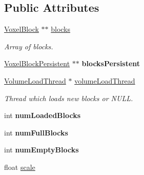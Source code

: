 \subsection*{\-Public \-Attributes}
\begin{DoxyCompactItemize}
\item 
\hypertarget{classVoxelVolume_ac5d3454b2ce3d2fea90c431b1aba0f3f}{
\hyperlink{classVoxelBlock}{\-Voxel\-Block} $\ast$$\ast$ \hyperlink{classVoxelVolume_ac5d3454b2ce3d2fea90c431b1aba0f3f}{blocks}}
\label{d0/d1c/classVoxelVolume_ac5d3454b2ce3d2fea90c431b1aba0f3f}

\begin{DoxyCompactList}\small\item\em \-Array of blocks. \end{DoxyCompactList}\item 
\hypertarget{classVoxelVolume_adee15c96fe563a59e2715898b209c68e}{
\hyperlink{classVoxelBlockPersistent}{\-Voxel\-Block\-Persistent} $\ast$$\ast$ {\bfseries blocks\-Persistent}}
\label{d0/d1c/classVoxelVolume_adee15c96fe563a59e2715898b209c68e}

\item 
\hypertarget{classVoxelVolume_a97000d1f3dc5808a9666240184e7fd3d}{
\hyperlink{classVolumeLoadThread}{\-Volume\-Load\-Thread} $\ast$ \hyperlink{classVoxelVolume_a97000d1f3dc5808a9666240184e7fd3d}{volume\-Load\-Thread}}
\label{d0/d1c/classVoxelVolume_a97000d1f3dc5808a9666240184e7fd3d}

\begin{DoxyCompactList}\small\item\em \-Thread which loads new blocks or \-N\-U\-L\-L. \end{DoxyCompactList}\item 
\hypertarget{classVoxelVolume_a88fe169a5d3eee4ded15a803eeb531e0}{
int {\bfseries num\-Loaded\-Blocks}}
\label{d0/d1c/classVoxelVolume_a88fe169a5d3eee4ded15a803eeb531e0}

\item 
\hypertarget{classVoxelVolume_a035d8438b53aa37705c85e2b9dc4033f}{
int {\bfseries num\-Full\-Blocks}}
\label{d0/d1c/classVoxelVolume_a035d8438b53aa37705c85e2b9dc4033f}

\item 
\hypertarget{classVoxelVolume_ad088d244390dcf695675e42d697b953f}{
int {\bfseries num\-Empty\-Blocks}}
\label{d0/d1c/classVoxelVolume_ad088d244390dcf695675e42d697b953f}

\item 
\hypertarget{classVoxelVolume_a1d986ee8a74dc700d400ed389eea6f6a}{
float \hyperlink{classVoxelVolume_a1d986ee8a74dc700d400ed389eea6f6a}{scale}}
\label{d0/d1c/classVoxelVolume_a1d986ee8a74dc700d400ed389eea6f6a}


\end{DoxyCompactItemize}
